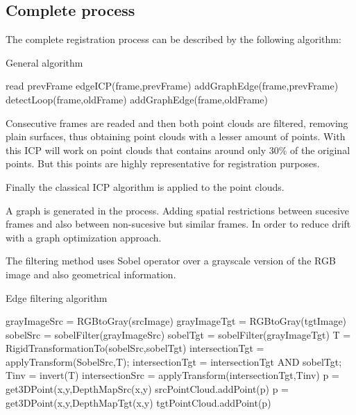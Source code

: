 \subsection{Complete process}

The complete registration process can be described by the following algorithm:

\begin{algorithm}
\caption{General algorithm}
\begin{algorithmic}[1]
\State read prevFrame
\State edgeICP(frame,prevFrame)
\State addGraphEdge(frame,prevFrame)
\State detectLoop(frame,oldFrame)
\State addGraphEdge(frame,oldFrame)
\EndIf
\EndFor
\EndWhile
\end{algorithmic}
\end{algorithm}

Consecutive frames are readed and then both point clouds are filtered, removing plain surfaces, thus obtaining point clouds 
with a lesser amount of points. With this ICP will work on point clouds that contains around 
only 30\% of the original points. But this points are highly representative for registration purposes.

Finally the classical ICP algorithm is applied to the point clouds.

A graph is generated in the process. Adding spatial restrictions between sucesive frames and also between non-sucesive but similar 
frames. In order to reduce drift with a graph optimization approach.


The filtering method uses Sobel operator over a grayscale version of the RGB image and also geometrical information.

\begin{algorithm}
\caption{Edge filtering algorithm}
\begin{algorithmic}[1]
\State grayImageSrc = RGBtoGray(srcImage)
\State grayImageTgt = RGBtoGray(tgtImage)
\State sobelSrc = sobelFilter(grayImageSrc)
\State sobelTgt = sobelFilter(grayImageTgt)
\State T = RigidTransformationTo(sobelSrc,sobelTgt)
\State intersectionTgt = applyTransform(SobelSrc,T);
\State intersectionTgt = intersectionTgt AND sobelTgt;
\State Tinv = invert(T)
\State intersectionSrc = applyTransform(intersectionTgt,Tinv)
\State p = get3DPoint(x,y,DepthMapSrc(x,y)
\State srcPointCloud.addPoint(p)
\EndIf
{}
\State p = get3DPoint(x,y,DepthMapTgt(x,y)
\State tgtPointCloud.addPoint(p)
\EndIf
\EndFor
\end{algorithmic}
\end{algorithm}

